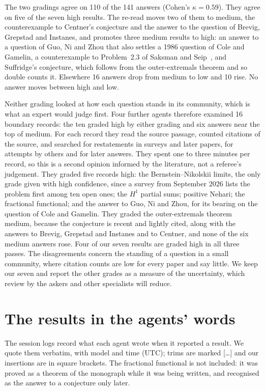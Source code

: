 \documentclass[11pt]{amsart}
\newcommand*{\sectionbreak}{\clearpage} %
\begin{document}
The two gradings agree on 110 of the 141 answers (Cohen's $\kappa=0.59$). They
agree on five of the seven high results. The re-read moves two of them to
medium, the counterexample to Centner's conjecture and the answer to the
question of Brevig, Grepstad and Instanes, and promotes three medium results to
high: an answer to a question of Guo, Ni and Zhou that also settles a 1986
question of Cole and Gamelin, a counterexample to Problem~2.3 of Saksman and
Seip~\cite{saksman-seip}, and Suffridge's conjecture, which follows from the
outer-extremals theorem and so double counts it. Elsewhere 16 answers drop from
medium to low and 10 rise. No answer moves between high and low.

Neither grading looked at how each question stands in its community, which is
what an expert would judge first. Four further agents therefore examined 16
boundary records: the ten graded high by either grading and six answers near
the top of medium. For each record they read the source passage, counted
citations of the source, and searched for restatements in surveys and later
papers, for attempts by others and for later answers. They spent one to three
minutes per record, so this is a second opinion informed by the literature, not
a referee's judgement. They graded five records high: the Bernstein--Nikolskii
limits, the only grade given with high confidence, since a survey from
September 2026 lists the problem first among ten open ones; the $H^1$ partial
sums; positive Nehari; the fractional functional; and the answer to Guo, Ni and
Zhou, for its bearing on the question of Cole and Gamelin. They graded the
outer-extremals theorem medium, because the conjecture is recent and lightly
cited, along with the answers to Brevig, Grepstad and Instanes and to Centner,
and none of the six medium answers rose. Four of our seven results are graded
high in all three passes. The disagreements concern the standing of a question
in a small community, where citation counts are low for every paper and say
little. We keep our seven and report the other grades as a measure of the
uncertainty, which review by the askers and other specialists will reduce.

\sectionbreak
\section{The results in the agents' words}\label{app:discoveries}

The session logs record what each agent wrote when it reported a result. We
quote them verbatim, with model and time (UTC); trims are marked [\dots] and
our insertions are in square brackets. The fractional functional is not
included: it was proved as a theorem of the monograph while it was being
written, and recognised as the answer to a conjecture only later.
\end{document}

